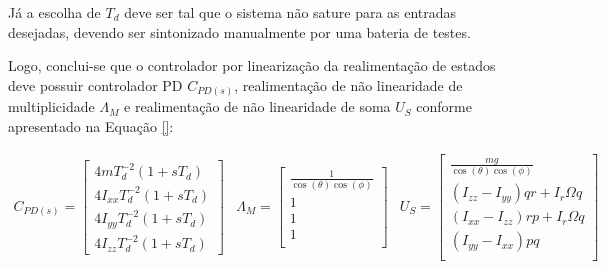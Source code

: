 \documentclass[main.tex]{subfiles}
\begin{document}
\textcolor{att}{
Já a escolha de $T_d$ deve ser tal que o sistema não sature para as entradas desejadas, devendo ser sintonizado manualmente por uma bateria de testes.
}

\textcolor{att}{
Logo, conclui-se que o controlador por linearização da realimentação de estados deve possuir controlador PD $C_{PD(s)}$, realimentação de não linearidade de multiplicidade $\Lambda_M$ e realimentação de não linearidade de soma $U_S$ conforme apresentado na Equação \ref{}:
}

\textcolor{att}{
\begin{equation}
    \begin{matrix}
        C_{PD(s)} = \begin{bmatrix}
            4mT_d^{-2}(1 + sT_d)\\
            4I_{xx}T_d^{-2}(1 + sT_d)\\
            4I_{yy}T_d^{-2}(1 + sT_d)\\
            4I_{zz}T_d^{-2}(1 + sT_d)
        \end{bmatrix}&
        \Lambda_{M} = 
        \begin{bmatrix}
            \frac{1}{\cos{(\theta)}\cos{(\phi)}}\\
            1\\
            1\\
            1\\
        \end{bmatrix}&
        U_S = 
        \begin{bmatrix}
            \frac{mg}{\cos{(\theta)}\cos{(\phi)}}\\
            (I_{zz} - I_{yy})qr + I_r\Omega q\\
            (I_{xx} - I_{zz})rp + I_r\Omega q\\
            (I_{yy} - I_{xx})pq\\
        \end{bmatrix}
    \end{matrix}
\end{equation}
}




\end{document}
